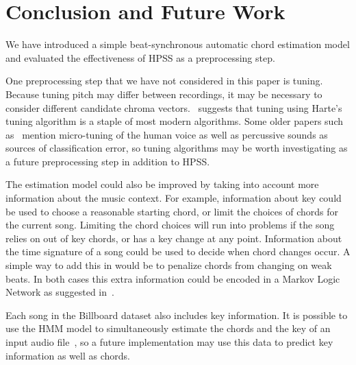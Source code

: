 \documentclass{article}
\begin{document}
\section{Conclusion and Future Work}

We have introduced a simple beat-synchronous automatic chord estimation model
and evaluated the effectiveness of HPSS as a preprocessing step.

One preprocessing step that we have not considered in this paper is tuning.
Because tuning pitch may differ between recordings, it may be necessary to
consider different candidate chroma vectors.~\cite{McVicar:00} suggests that
tuning using Harte's tuning algorithm is a staple of most modern algorithms.
Some older papers such as~\cite{Zenz:20} mention micro-tuning of the human
voice as well as percussive sounds as sources of classification error, so
tuning algorithms may be worth investigating as a future preprocessing step in
addition to HPSS\@.

The estimation model could also be improved by taking into account more
information about the music context. For example, information about key could
be used to choose a reasonable starting chord, or limit the choices of chords
for the current song. Limiting the chord choices will run into problems if the
song relies on out of key chords, or has a key change at any point. Information
about the time signature of a song could be used to decide when chord changes
occur. A simple way to add this in would be to penalize chords from changing on
weak beats. In both cases this extra information could be encoded in a Markov
Logic Network as suggested in~\cite{Papadopoulus:04}.

Each song in the Billboard dataset also includes key information. It is
possible to use the HMM model to simultaneously estimate the chords and the key
of an input audio file~\cite{McVicar:00}, so a future implementation may use
this data to predict key information as well as chords.
\end{document}
